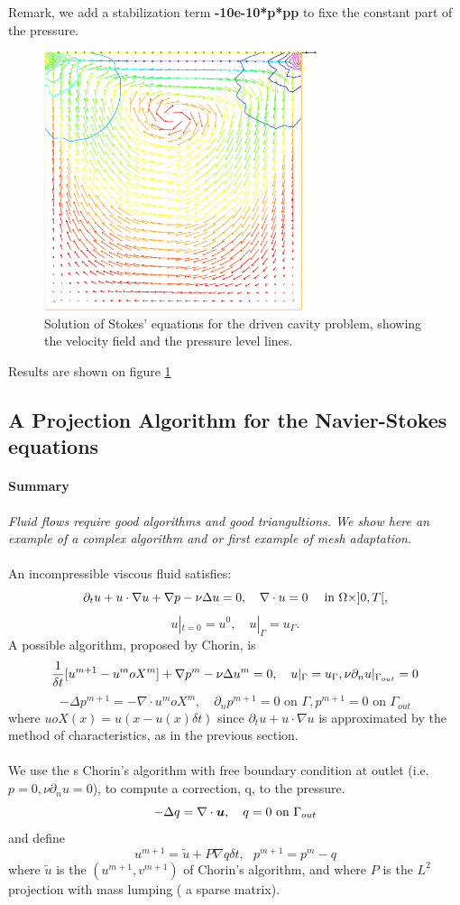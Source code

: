 \documentclass[a4paper,twoside,12pt]{book}
\def\vec#1{\mbox{\boldmath $#1$}}
\def\x#1{#1\index{#1}}%
\def\p{\partial}
\def\n{\nabla}
\begin{document}
Remark, we add a stabilization term {\bf{-10e-10*p*pp}} to fixe the constant part of the pressure.
\begin{figure}[htbp]
\begin{center}
\includegraphics[width=8cm]{stokes}

\caption{\label{figstokes} Solution of Stokes' equations for the driven cavity problem, showing the
velocity field and the pressure level lines.}
\end{center}
\end{figure}

Results are shown on figure \ref{figstokes}

\subsection{A Projection Algorithm for the Navier-Stokes equations }
\paragraph{Summary}\emph{Fluid flows require good algorithms and good triangultions. We show
here an example of a complex algorithm and or first example of \x{mesh adaptation}}.
\\\\
An incompressible viscous fluid satisfies:
$$ \p _t u + u\cdot\nabla u + \nabla p - \nu\Delta u = 0,\quad  \nabla\cdot u=0
\quad  \hbox{ in } \Omega\times ]0,T[,
$$
$$ u|_{t=0} = u^0,\quad  u|_\Gamma = u_\Gamma.
$$
A possible algorithm, proposed by Chorin, is
$$ {1\over \delta t}[u^{m+1} - u^moX^m] + \nabla p^m -\nu\Delta u^m= 0,\quad  u|_\Gamma = u_\Gamma, \nu \p_n u|_{\Gamma_{out}}=0 
  $$
$$ -\Delta p^{m+1} = -\nabla\cdot  u^moX^m, \quad  \p _n p^{m+1} = 0 \mbox{ on } \Gamma , p^{m+1} = 0 \mbox{ on } \Gamma_{out}
$$
where $uoX(x) = u(x-u(x)\delta t)$ since $\p _t u + u\cdot\nabla
u $ is approximated by the method of characteristics, as in the previous section.
\\\\
We use the s Chorin's algorithm with free boundary condition  at outlet (i.e.  $p=0,\nu \p_n u = 0$),  to compute a correction, q,
to the pressure. 
\[
    -\Delta q= \n\cdot\vec u ,  \quad q=0 \mbox{ on } \Gamma_{out}
\]
and define
\[
    u^{m+1}=\tilde u + P \n q\delta t,~~~p^{m+1}=p^m-q
\]
where $\tilde u$ is the $(u^{m+1},v^{m+1})$ of Chorin's algorithm,
and  where $P$ is the  $L^2$ projection with mass lumping ( a sparse matrix). 
\end{document}
